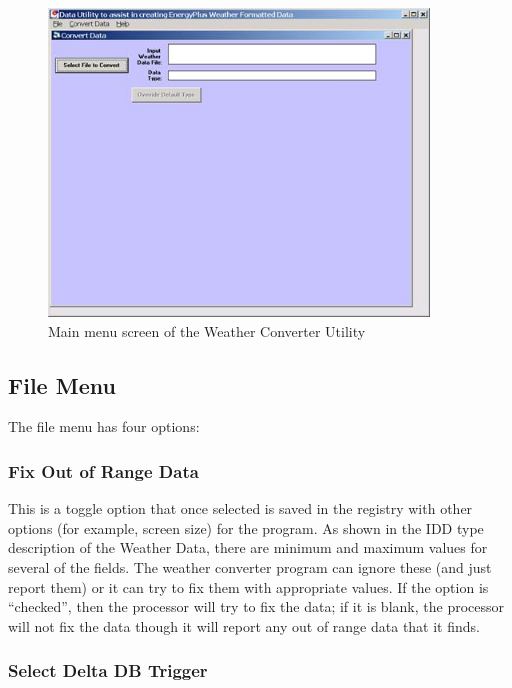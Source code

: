 \begin{figure}[hbtp] %
\centering
\includegraphics[width=0.9\textwidth, height=0.9\textheight, keepaspectratio=true]{media/image001.jpg}
\caption{Main menu screen of the Weather Converter Utility \protect \label{fig:main-menu-screen-of-the-weather-converter}}
\end{figure}

\subsection{File Menu}\label{file-menu-001}

The file menu has four options:

\subsubsection{Fix Out of Range Data}\label{fix-out-of-range-data}

This is a toggle option that once selected is saved in the registry with other options (for example, screen size) for the program. As shown in the IDD type description of the Weather Data, there are minimum and maximum values for several of the fields. The weather converter program can ignore these (and just report them) or it can try to fix them with appropriate values. If the option is ``checked'', then the processor will try to fix the data; if it is blank, the processor will not fix the data though it will report any out of range data that it finds.

\subsubsection{Select Delta DB Trigger}\label{select-delta-db-trigger}

